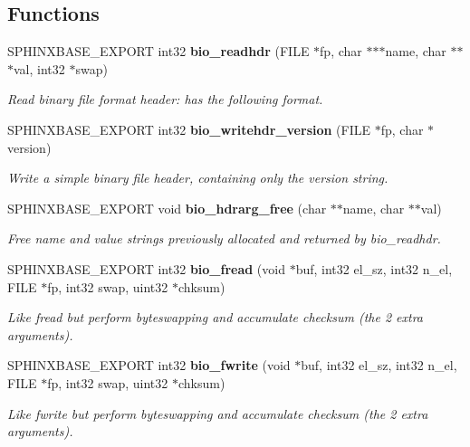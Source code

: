 \subsection*{Functions}
\begin{CompactItemize}
\item 
SPHINXBASE\_\-EXPORT int32 {\bf bio\_\-readhdr} (FILE $\ast$fp, char $\ast$$\ast$$\ast$name, char $\ast$$\ast$$\ast$val, int32 $\ast$swap)
\begin{CompactList}\small\item\em Read binary file format header: has the following format. \item\end{CompactList}\item 
SPHINXBASE\_\-EXPORT int32 {\bf bio\_\-writehdr\_\-version} (FILE $\ast$fp, char $\ast$version)
\begin{CompactList}\small\item\em Write a simple binary file header, containing only the version string. \item\end{CompactList}\item 
SPHINXBASE\_\-EXPORT void {\bf bio\_\-hdrarg\_\-free} (char $\ast$$\ast$name, char $\ast$$\ast$val)
\begin{CompactList}\small\item\em Free name and value strings previously allocated and returned by bio\_\-readhdr. \item\end{CompactList}\item 
SPHINXBASE\_\-EXPORT int32 {\bf bio\_\-fread} (void $\ast$buf, int32 el\_\-sz, int32 n\_\-el, FILE $\ast$fp, int32 swap, uint32 $\ast$chksum)
\begin{CompactList}\small\item\em Like fread but perform byteswapping and accumulate checksum (the 2 extra arguments). \item\end{CompactList}\item 
SPHINXBASE\_\-EXPORT int32 {\bf bio\_\-fwrite} (void $\ast$buf, int32 el\_\-sz, int32 n\_\-el, FILE $\ast$fp, int32 swap, uint32 $\ast$chksum)
\begin{CompactList}\small\item\em Like fwrite but perform byteswapping and accumulate checksum (the 2 extra arguments). \item\end{CompactList}\item 

\end{CompactItemize}
